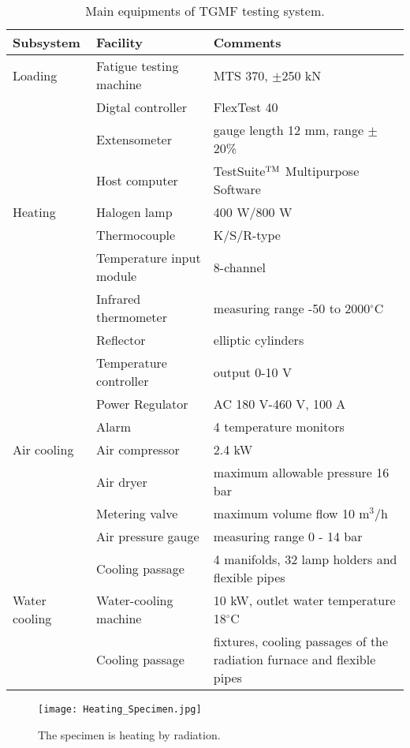 \begin{table}[htbp]
  \centering
  \caption{Main equipments of TGMF testing system.}
    \begin{tabular}{p{3cm}p{4.5cm}p{6.5cm}}
    \toprule
    Subsystem & Facility & Comments \\
    \midrule
    Loading  & Fatigue testing machine & MTS 370, $\pm$250 kN \\
          & Digtal controller & FlexTest 40 \\
          & Extensometer & gauge length 12 mm, range $\pm$20\% \\
          & Host computer &  TestSuite$^{\rm TM}$ Multipurpose Software\\
    \midrule
    Heating & Halogen lamp & 400 W/800 W \\
          & Thermocouple & K/S/R-type \\
          & Temperature input module & 8-channel \\
          & Infrared thermometer & measuring range -50 to 2000$^\circ$C \\
          & Reflector & elliptic cylinders \\
          & Temperature controller & output 0-10 V \\
          & Power Regulator & AC 180 V-460 V, 100 A \\
          & Alarm & 4 temperature monitors \\
    \midrule
    Air cooling & Air compressor & 2.4 kW \\
          & Air dryer & maximum allowable pressure 16 bar \\
          & Metering valve & maximum volume flow 10 m$^3$/h \\
          & Air pressure gauge & measuring range 0 - 14 bar \\
          & Cooling passage & 4 manifolds, 32 lamp holders and flexible pipes \\
    \midrule
    Water cooling & Water-cooling machine & 10 kW, outlet water temperature 18$^\circ$C \\
          & Cooling passage & fixtures, cooling passages of the radiation furnace and flexible pipes \\
    \bottomrule
    \end{tabular}%
  \label{Tab:TGMF_subsystem}%
\end{table}%

\begin{figure}[!htp]
	\centering
	\texttt{[image: Heating\_Specimen.jpg]}
	\caption{The specimen is heating by radiation.}
	\label{Fig:Heating_Specimen}
\end{figure}

